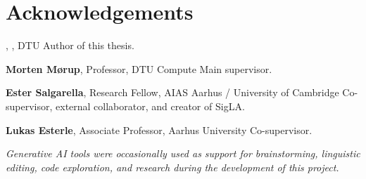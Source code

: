 \section*{Acknowledgements}

\textbf{\thesisauthor}, \authorstudy, DTU \newline
Author of this thesis.

\medskip

\textbf{Morten Mørup}, Professor, DTU Compute \newline
Main supervisor.

\medskip

\textbf{Ester Salgarella}, Research Fellow, AIAS Aarhus / University of Cambridge \newline
Co-supervisor, external collaborator, and creator of SigLA.

\medskip

\textbf{Lukas Esterle}, Associate Professor, Aarhus University \newline
Co-supervisor.

\textit{Generative AI tools were occasionally used as support for brainstorming, linguistic editing, code exploration, and research during the development of this project.}
